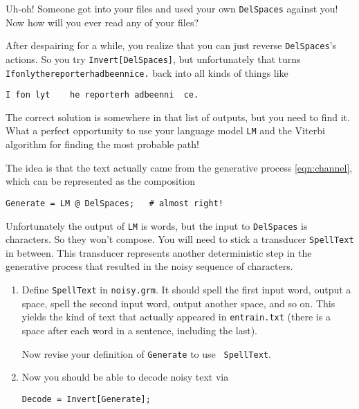 \documentclass[11pt]{article}
\newcommand{\deliverableneeded}[0]{} %
\begin{document}
\begin{enumerate}[resume]
\begin{enumerate}
  \end{enumerate}

  Uh-oh! Someone got into your files and used your own
  \texttt{DelSpaces} against you! Now how will you ever read any of
  your files?

  After despairing for a while, you realize that you can just reverse
  \texttt{DelSpaces}'s actions.  So you try {\tt Invert[DelSpaces]},
  but unfortunately that turns {\tt Ifonlythereporterhadbeennice.}  back
  into all kinds of things like
\begin{verbatim}
I fon lyt    he reporterh adbeenni  ce.
\end{verbatim}
    The correct solution is somewhere in that list of outputs, but you
    need to find it.  What a perfect opportunity to use your language
    model {\tt LM} and the Viterbi algorithm for finding the most
    probable path!

    The idea is that the text actually came from the generative
    process \eqref{eqn:channel}, which can be represented as the
    composition
\begin{verbatim}
Generate = LM @ DelSpaces;   # almost right!
\end{verbatim}

    Unfortunately the output of {\tt LM} is words, but the input to
    {\tt DelSpaces} is characters.  So they won't compose.  You will
    need to stick a transducer {\tt SpellText} in between.  This
    transducer represents another deterministic step in the generative
    process that resulted in the noisy sequence of characters.

    \begin{enumerate}[resume]
    \item Define {\tt SpellText} in {\tt noisy.grm}.  It should spell
      the first input word, output a space, spell the second input
      word, output another space, and so on.  This yields the kind of
      text that actually appeared in {\tt entrain.txt} (there is a
      space after each word in a sentence, including the last).


      Now revise your definition of {\tt Generate} to use {\tt
        SpellText}.

  \item \deliverableneeded{} \label{q:decodecomp}
    Now you should be able to decode noisy text via
\begin{verbatim}
Decode = Invert[Generate];
\end{verbatim}


\end{enumerate}
\end{enumerate}
\end{document}
